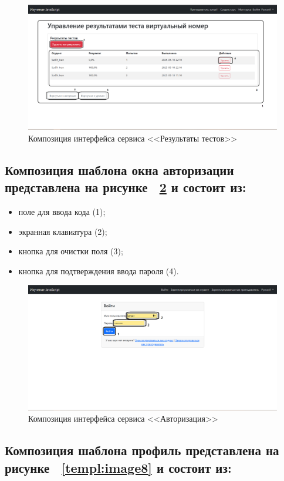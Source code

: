 \begin{figure}[htp!]
	\centering
	\includegraphics[width=0.8\linewidth]{images/результаты}
	\caption{Композиция интерфейса сервиса <<Результаты тестов>>}
	\label{templ:image6}
\end{figure}

\subsection*{Композиция шаблона окна авторизации представлена на рисунке ~\ref{templ:image7} и состоит из:}

\begin{itemize}
	\item поле для ввода кода (1);
	\item экранная клавиатура (2);
	\item кнопка для очистки поля (3);
	\item кнопка для подтверждения ввода пароля (4).
\end{itemize}

\begin{figure}[htp!]
	\centering
	\includegraphics[width=0.8\linewidth]{images/Авторизация}
	\caption{Композиция интерфейса сервиса <<Авторизация>>}
	\label{templ:image7}
\end{figure}

\subsection*{Композиция шаблона профиль представлена на рисунке ~\ref{templ:image8} и состоит из:}

